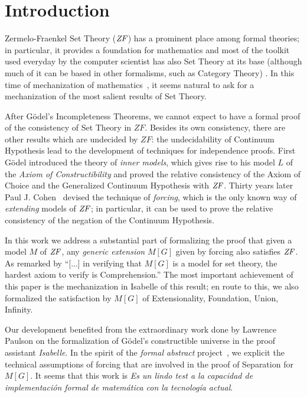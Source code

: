 \section{Introduction}
Zermelo-Fraenkel Set Theory ($\mathit{ZF}$) has a prominent place among formal
theories; in particular, it provides a foundation for mathematics and
most of the toolkit used everyday by the computer scientist has also
Set Theory at its base (although much of it can be based in other
formalisms, such as Category Theory) . In this time of mechanization of
mathematics~\cite{avigad2018mechanization}, it seems natural to ask
for a mechanization of the most salient results of Set Theory.

After G\"odel's Incompleteness Theorems, we cannot expect to have a
formal proof of the consistency of Set Theory in $ZF$. Besides its own
consistency, there are other results which are undecided by $ZF$: the
undecidability of Continuum Hypothesis lead to the development of
techniques for independence proofs. First G\"odel introduced the
theory of \emph{inner models}, which gives rise to his model $L$ of
the \emph{Axiom of Constructibility} \cite{godel-L} and proved the
relative consistency of the Axiom of Choice and the Generalized
Continuum Hypothesis with $\mathit{ZF}$. Thirty years later Paul
J. Cohen~\cite{Cohen-CH-PNAS} devised the technique of \emph{forcing},
which is the only known way of \emph{extending} models of $\mathit{ZF}$; in
particular, it can be used to prove the relative consistency of the
negation of the Continuum Hypothesis. 

In this work we address a substantial part of formalizing the proof
that given a model $M$ of $\mathit{ZF}$, any \emph{generic extension} $M[G]$
given by forcing also satisfies $\mathit{ZF}$. As remarked by
\citet[][p.250]{kunen2011set} \enquote{[...] in verifying that $M[G]$
  is a model for set theory, the hardest axiom to verify is
  Comprehension.}  The most important achievement of this paper is the
mechanization in Isabelle of this result; en route to this, we also
formalized the satisfaction by $M[G]$ of Extensionality, Foundation,
Union, Infinity.

Our development benefited from the extraordinary work done by Lawrence
Paulson \cite{paulson_2003} on the formalization of G\"odel's
constructible universe in the proof assistant \emph{Isabelle}. In the
spirit of the \emph{formal abstract} project~\cite{hales-fabstracts},
we explicit the technical assumptions of forcing that are involved in
the proof of Separation for $M[G]$. It seems that this work is
\emph{Es un lindo test a la capacidad de implementación formal de
  matemática con la tecnología actual}.

